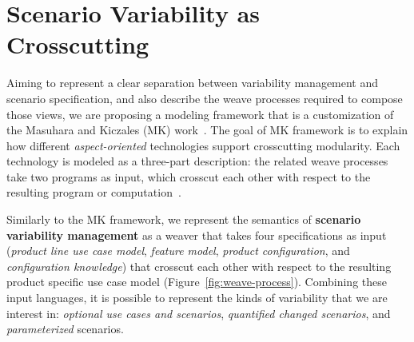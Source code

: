 

\section{Scenario Variability as Crosscutting}
\label{sec:models}

Aiming to represent a clear separation between variability management and scenario specification, and also 
describe the weave processes required to compose those views, we are proposing a modeling framework that is a 
customization of the Masuhara and Kiczales (MK) work~\cite{kiczales-ecoop-2003}. The goal of MK framework is to
explain how different \emph{aspect-oriented} technologies support crosscutting modularity. Each technology is modeled 
as a three-part description: the related weave processes take two programs as input, which crosscut each other with respect 
to the resulting program or computation~\cite{kiczales-ecoop-2003}. 

Similarly to the MK framework, we represent the semantics of \textbf{scenario variability management} as a weaver that takes four specifications
as input (\emph{product line use case model}, \emph{feature model}, \emph{product configuration}, and \emph{configuration knowledge}) that 
crosscut each other with respect to the resulting product specific use case model (Figure~\ref{fig:weave-process}). Combining these input languages, 
it is possible to represent the kinds of variability that we are interest in: \emph{optional use cases and scenarios}, \emph{quantified changed scenarios}, 
and \emph{parameterized} scenarios. 

